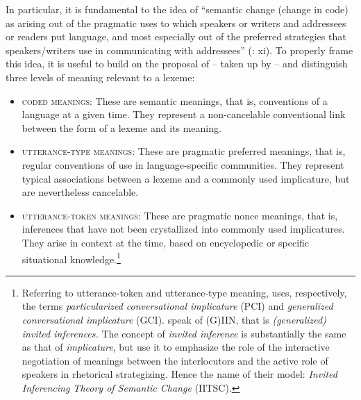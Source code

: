 In particular, it is fundamental to the idea of “semantic change (change in code) as arising out of the pragmatic uses to which speakers or writers and addressees or readers put language, and most especially out of the preferred strategies that speakers/writers use in communicating with addressees” (\citealt{TraugottDasher2002}: xi). To properly frame this idea, it is useful to build on the proposal of \citet{Levinson1995,Levinson2000} – taken up by \citet[16–17]{TraugottDasher2002} – and distinguish three levels of meaning relevant to a lexeme:

\begin{itemize}
    
\item \textsc{coded} \textsc{meanings}:  These are semantic meanings, that is, conventions of a language at a given time. They represent a non-cancelable conventional link between the form of a lexeme and its meaning.

\item \textsc{utterance-type} \textsc{meanings}: These are pragmatic preferred meanings, that is, regular conventions of use in language-specific communities. They represent typical associations between a lexeme and a commonly used implicature, but are nevertheless cancelable.

\item \textsc{utterance-token} \textsc{meanings}: These are pragmatic nonce meanings, that is, inferences that have not been crystallized into commonly used implicatures. They arise in context at the time, based on encyclopedic or specific situational knowledge.\footnote{Referring to utterance-token and utterance-type meaning, \citet{Levinson2000} uses, respectively, the terms \textit{particularized conversational implicature} (PCI) and \textit{generalized conversational implicature} (GCI). \citet{TraugottDasher2002} speak of (G)IIN, that is \textit{(generalized) invited inferences.} The concept of \textit{invited inference} is substantially the same as that of \textit{implicature}, but \citet{TraugottDasher2002} use it to emphasize the role of the interactive negotiation of meanings between the interlocutors and the active role of speakers in rhetorical strategizing. Hence the name of their model: \textit{Invited Inferencing Theory of Semantic Change} (IITSC).}

\end{itemize}

